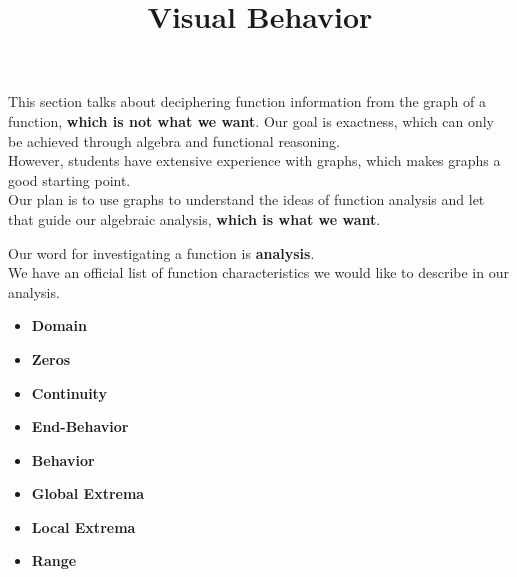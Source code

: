 \documentclass{ximera}
\title{Visual Behavior}
\begin{document}
\begin{abstract}
\end{abstract}
\maketitle





\begin{warning}


This section talks about deciphering function information from the graph of a function, \textbf{\textcolor{red!80!black}{which is not what we want}}.  Our goal is exactness, which can only be achieved through algebra and functional reasoning.\\

However, students have extensive experience with graphs, which makes graphs a good starting point. \\

Our plan is to use graphs to understand the ideas of function analysis and let that guide our algebraic analysis, \textbf{\textcolor{red!80!black}{which is what we want}}.

\end{warning}






Our word for investigating a function is \textbf{\textcolor{blue!55!black}{analysis}}. \\

We have an official list of function characteristics we would like to describe in our analysis. \\





\begin{itemize}
\item \textbf{\textcolor{red!90!darkgray}{Domain}}
\item \textbf{\textcolor{red!90!darkgray}{Zeros}}
\item \textbf{\textcolor{red!90!darkgray}{Continuity}}
\item \textbf{\textcolor{red!90!darkgray}{End-Behavior}}
\item \textbf{\textcolor{red!90!darkgray}{Behavior}}
\item \textbf{\textcolor{red!90!darkgray}{Global Extrema}}
\item \textbf{\textcolor{red!90!darkgray}{Local Extrema}}
\item \textbf{\textcolor{red!90!darkgray}{Range}}
\end{itemize}
\end{document}
